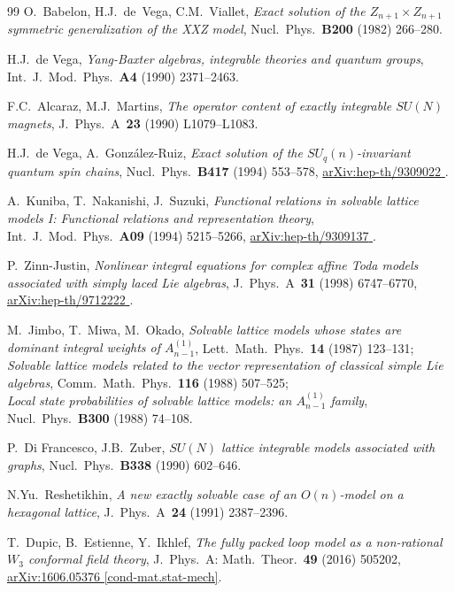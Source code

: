 \documentclass[11pt]{article}
\numberwithin{equation}{section}
\theoremstyle{plain}
\numberwithin{equation}{section}
\def\arxiv#1#2{\href{http://arxiv.org/abs/#1}{\textsf{arXiv:#1 #2}}}
\begin{document}
\begin{thebibliography}{99}
O.~Babelon, H.J.~de~Vega, C.M.~Viallet,
{\em Exact solution of the $Z_{n+1}\times Z_{n+1}$ symmetric generalization of the XXZ model}, 
Nucl.~Phys.~{\bf B200} (1982) 266--280.
	
H.J.~de Vega,
{\em Yang-Baxter algebras, integrable theories and quantum groups}, 
Int.~J.~Mod.~Phys.~{\bf A4} (1990) 2371--2463.

F.C.~Alcaraz, M.J.~Martins,
{\em The operator content of exactly integrable $SU(N)$ magnets}, 
J.~Phys.~A~{\bf 23} (1990) L1079--L1083.
		
H.J.~de Vega, A.~Gonz\'alez-Ruiz, 
{\em Exact solution of the $SU_q(n)$-invariant quantum spin chains},
Nucl.~Phys.~{\bf B417} (1994) 553--578,
\arxiv{hep-th/9309022}{\!\!}.

A.~Kuniba, T.~Nakanishi, J.~Suzuki,
{\em Functional relations in solvable lattice models I: Functional relations and representation theory},
Int.~J.~Mod.~Phys.~{\bf A09} (1994) 5215--5266,
\arxiv{hep-th/9309137}{\!\!}.

P.~Zinn-Justin,
{\em Nonlinear integral equations for complex affine Toda models associated with simply laced Lie algebras}, 
J.~Phys.~A~{\bf 31} (1998) 6747--6770, 
\arxiv{hep-th/9712222}{\!\!}.

M.~Jimbo, T.~Miwa, M.~Okado,
{\em Solvable lattice models whose states are dominant integral weights of $A_{n-1}^{(1)}$}, 
Lett.~Math.~Phys.~{\bf 14} (1987) 123--131;\\
{\em Solvable lattice models related to the vector representation of classical simple Lie algebras}, 
Comm.~Math.~Phys.~{\bf 116} (1988) 507--525; \\
{\em Local state probabilities of solvable lattice models: an $A_{n-1}^{(1)}$ family}, 
Nucl.~Phys.~{\bf B300} (1988) 74--108.

P.~Di Francesco, J.B.~Zuber,
{\em $SU(N)$ lattice integrable models associated with graphs},
Nucl.~Phys.~{\bf B338} (1990) 602--646.

N.Yu.~Reshetikhin,
{\em A new exactly solvable case of an $O(n)$-model on a hexagonal lattice}, 
J.~Phys.~A~{\bf 24} (1991) 2387--2396.
	
T.~Dupic, B.~Estienne, Y.~Ikhlef,
{\em The fully packed loop model as a non-rational $W_3$ conformal field theory},
J.~Phys.~A: Math.~Theor.~{\bf 49} (2016) 505202,
\arxiv{1606.05376}{[cond-mat.stat-mech]}.
	

\end{thebibliography}
\end{document}
